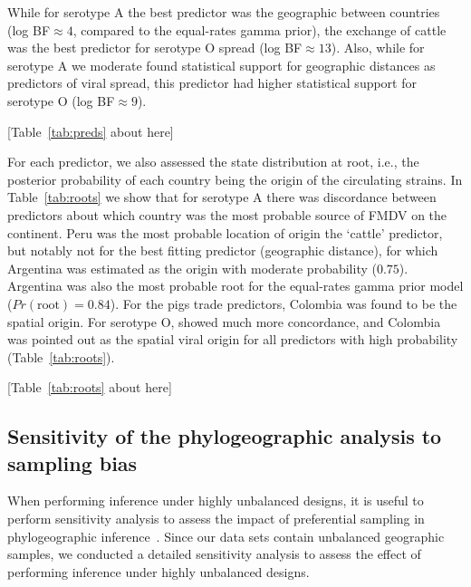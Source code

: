 \documentclass[10pt]{article}
\begin{document}
While for serotype A the best predictor was the geographic between countries (log BF$\approx 4$, compared to the equal-rates gamma prior), the exchange of cattle was the best predictor for serotype O spread (log BF$\approx 13$).
Also, while for serotype A we moderate found statistical support for geographic distances as predictors of viral spread, this predictor had higher statistical support for serotype O (log BF$\approx 9$).

\begin{center}
 [Table~\ref{tab:preds} about here]
\end{center}

For each predictor, we also assessed the state distribution at root, i.e., the posterior probability of each country being the origin of the circulating strains.
In Table~\ref{tab:roots} we show that for serotype A there was discordance between predictors about which country was the most probable source of FMDV on the continent.
Peru was the most probable location of origin the `cattle' predictor, but notably not for the best fitting predictor (geographic distance), for which Argentina was estimated as the origin with moderate probability ($0.75$).
Argentina was also the most probable root for the equal-rates gamma prior model ($Pr(\text{root})=0.84$).
For the pigs trade predictors, Colombia was found to be the spatial origin.
For serotype O, showed much more concordance, and Colombia was pointed out as the spatial viral origin for all predictors with high probability (Table~\ref{tab:roots}).


\begin{center}
 [Table~\ref{tab:roots} about here]
\end{center}

\subsection*{Sensitivity of the phylogeographic analysis to sampling bias}

When performing inference under highly unbalanced designs, it is useful to perform sensitivity analysis to assess the impact of preferential sampling in phylogeographic inference~\cite{Faria2012,polar,fluPNAS}. 
Since our data sets contain unbalanced geographic samples, we conducted a detailed sensitivity analysis to assess the effect of performing inference under highly unbalanced designs.
\end{document}
